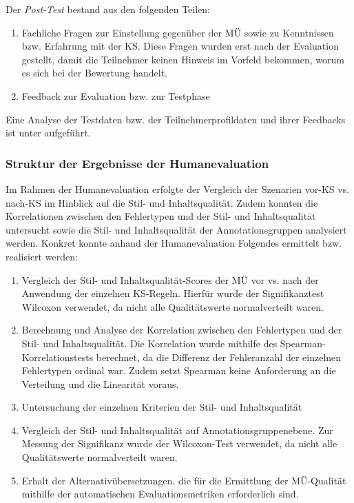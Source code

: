 Der \textit{Post-Test} bestand aus den folgenden Teilen:

\begin{enumerate}[label = {Teil \arabic*:}, align = left]
\item Fachliche Fragen zur Einstellung gegenüber der MÜ sowie zu Kenntnissen bzw. Erfahrung mit der KS. Diese Fragen wurden erst nach der Evaluation gestellt, damit die Teilnehmer keinen Hinweis im Vorfeld bekommen, worum es sich bei der Bewertung handelt.

\item Feedback zur Evaluation bzw. zur Testphase
\end{enumerate}

Eine Analyse der Testdaten bzw. der Teilnehmerprofildaten und ihrer Feedbacks ist unter  aufgeführt.


\subsubsection{\label{sec:4.4.5.4}Struktur der Ergebnisse der Humanevaluation}

Im Rahmen der Humanevaluation erfolgte der Vergleich der Szenarien vor-KS vs. nach-KS im Hinblick auf die Stil- und Inhaltsqualität. Zudem konnten die Korrelationen zwischen den Fehlertypen und der Stil- und Inhaltsqualität untersucht sowie die Stil- und Inhaltsqualität der Annotationsgruppen analysiert werden. Konkret konnte anhand der Humanevaluation Folgendes ermittelt bzw. realisiert werden:

\begin{enumerate}[label = {(\arabic*)}, align = left]
\item Vergleich der Stil- und Inhaltsqualität-Scores der MÜ vor vs. nach der Anwendung der einzelnen KS-Regeln. Hierfür wurde der Signifikanztest Wilcoxon verwendet, da nicht alle Qualitätswerte normalverteilt waren.
\item Berechnung und Analyse der Korrelation zwischen den Fehlertypen und der Stil- und Inhaltsqualität. Die Korrelation wurde mithilfe des Spearman-Korrelationstests berechnet, da die Differenz der Fehleranzahl der einzelnen Fehlertypen ordinal war. Zudem setzt Spearman keine Anforderung an die Verteilung und die Linearität voraus.
\item Untersuchung der einzelnen Kriterien der Stil- und Inhaltsqualität
\item Vergleich der Stil- und Inhaltsqualität auf Annotationsgruppenebene. Zur Messung der Signifikanz wurde der Wilcoxon-Test verwendet, da nicht alle Qualitätswerte normalverteilt waren.
\item Erhalt der Alternativübersetzungen, die für die Ermittlung der MÜ-Qualität mithilfe der automatischen Evaluationsmetriken erforderlich sind.
\end{enumerate}


